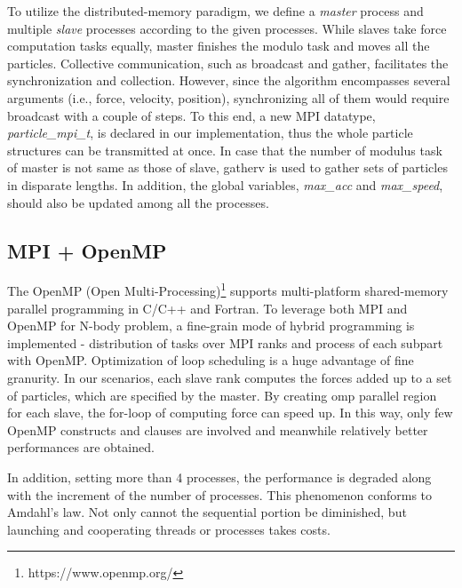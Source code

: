\documentclass{scrartcl}
\begin{document}
\noindent To utilize the distributed-memory paradigm, we define a \textit{master} process and multiple \textit{slave} processes according to the given processes.
While slaves take force computation tasks equally, master finishes the modulo task and moves all the particles.
Collective communication, such as broadcast and gather,  facilitates the synchronization and collection. 
However, since the algorithm encompasses several arguments (i.e., force, velocity, position), synchronizing all of them would require broadcast with a couple of steps.
To this end, a new MPI datatype, \textit{particle\_mpi\_t}, is declared in our implementation, thus the whole particle structures can be transmitted at once. 
In case that the number of modulus task of master is not same as those of slave, gatherv is used to gather sets of particles in disparate lengths. 
In addition, the global variables, \textit{max\_acc} and \textit{max\_speed}, should also be updated among all the processes.

\subsection{MPI + OpenMP}
The OpenMP (Open Multi-Processing)\footnote{https://www.openmp.org/} supports multi-platform shared-memory parallel programming in C/C++ and Fortran.
To leverage both MPI and OpenMP for N-body problem, a fine-grain mode of hybrid programming is implemented - distribution of tasks over MPI ranks and process of each subpart with OpenMP.
Optimization of loop scheduling is a huge advantage of fine granurity.
In our scenarios, each slave rank computes the forces added up to a set of particles, which are specified by the master.
By creating omp parallel region for each slave, the for-loop of computing force can speed up. In this way, only few OpenMP constructs and clauses are involved and meanwhile relatively better performances are obtained. 

\noindent In addition, setting more than 4 processes, the performance is degraded along with the increment of the number of processes.
This phenomenon conforms to Amdahl's law.
Not only cannot the sequential portion be diminished, but launching and cooperating threads or processes takes costs. 
\end{document}
